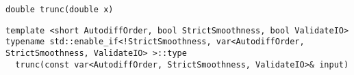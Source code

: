 \begin{tcolorbox}[colback=white,colframe=gray90, coltitle=black,boxrule=3pt,
fonttitle=\bfseries,title= Trunc]

\begin{verbatim}
double trunc(double x)

\end{verbatim}

\begin{verbatim}
template <short AutodiffOrder, bool StrictSmoothness, bool ValidateIO>
typename std::enable_if<!StrictSmoothness, var<AutodiffOrder, StrictSmoothness, ValidateIO> >::type
  trunc(const var<AutodiffOrder, StrictSmoothness, ValidateIO>& input)

\end{verbatim}

\end{tcolorbox}

